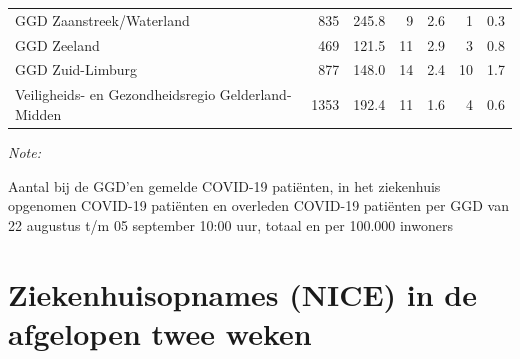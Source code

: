 \documentclass[
  english,
  man,floatsintext]{apa6}
\begin{document}
\begin{table}
\begin{threeparttable}
\begin{tabular}{lrrrrrr}
GGD Zaanstreek/Waterland & 835 & 245.8 & 9 & 2.6 & 1 & 0.3\\
GGD Zeeland & 469 & 121.5 & 11 & 2.9 & 3 & 0.8\\
GGD Zuid-Limburg & 877 & 148.0 & 14 & 2.4 & 10 & 1.7\\
Veiligheids- en Gezondheidsregio Gelderland-Midden & 1353 & 192.4 & 11 & 1.6 & 4 & 0.6\\
\bottomrule
\end{tabular}
\begin{tablenotes}
\item \textit{Note: } 
\item Aantal bij de GGD’en gemelde COVID-19 patiënten, in het ziekenhuis opgenomen COVID-19 patiënten en overleden COVID-19 patiënten per GGD van 22 augustus t/m 05 september 10:00 uur, totaal en per 100.000 inwoners
\end{tablenotes}
\end{threeparttable}
\endgroup{}
\end{table}

\newpage

\hypertarget{ziekenhuisopnames-nice-in-de-afgelopen-twee-weken}{%
\section{Ziekenhuisopnames (NICE) in de afgelopen twee weken}\label{ziekenhuisopnames-nice-in-de-afgelopen-twee-weken}}
\end{document}
